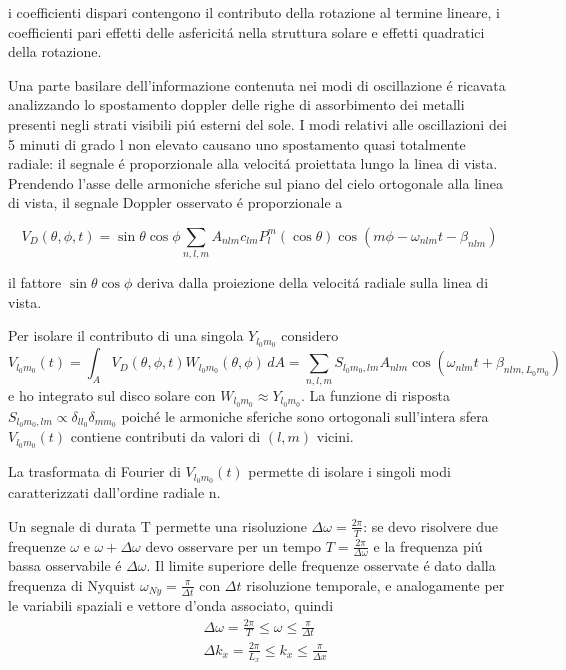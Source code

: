 \documentclass[../main.tex]{subfiles}
\begin{document}
i coefficienti dispari contengono il contributo della rotazione al termine lineare, i coefficienti pari effetti delle asfericit\'a nella struttura solare e effetti quadratici della rotazione.

Una parte basilare dell'informazione contenuta nei modi di oscillazione \'e ricavata analizzando  lo spostamento doppler delle righe di assorbimento dei metalli presenti negli strati visibili pi\'u esterni del sole.
I modi relativi alle oscillazioni dei 5 minuti di grado l non elevato causano uno spostamento quasi totalmente radiale: il segnale \'e proporzionale alla velocit\'a proiettata lungo la linea di vista. Prendendo l'asse delle armoniche sferiche sul piano del cielo ortogonale alla linea di vista, il segnale Doppler osservato \'e proporzionale a

\begin{equation}
    V_D(\theta,\phi,t)=\sin{\theta}\cos{\phi}\sum_{n,l,m}A_{nlm}c_{lm}P_l^m(\cos{\theta})\cos{(m\phi-\omega_{nlm}t-\beta_{nlm})}
\end{equation}

il fattore $\sin{\theta}\cos{\phi}$ deriva dalla proiezione della velocit\'a radiale sulla linea di vista.

Per isolare il contributo di una singola $Y_{l_0m_0}$ considero
\begin{equation}
V_{l_0m_0}(t)=\int_AV_D(\theta,\phi,t)W_{l_0m_0}(\theta,\phi)\,dA=\sum_{n,l,m}S_{l_0m_0,lm}A_{nlm}\cos{(\omega_{nlm}t+\beta_{nlm,L_0m_0})}
\end{equation}
e ho integrato sul disco solare con $W_{l_0m_0}\approx Y_{l_0m_0}$. La funzione di risposta $S_{l_0m_0,lm}\propto\delta_{ll_0}\delta_{mm_0}$ poich\'e le armoniche sferiche sono ortogonali sull'intera sfera $V_{l_0m_0}(t)$ contiene contributi da valori di $(l,m)$ vicini.

La trasformata di Fourier di $V_{l_0m_0}(t)$ permette di isolare i singoli modi caratterizzati dall'ordine radiale n.

Un segnale di durata T permette una risoluzione $\Delta\omega=\frac{2\pi}{T}$: se devo risolvere due frequenze $\omega$ e $\omega+\Delta\omega$ devo osservare per un tempo $T=\frac{2\pi}{\Delta\omega}$ e la frequenza pi\'u bassa osservabile \'e $\Delta\omega$. Il limite superiore delle frequenze osservate \'e dato dalla frequenza di Nyquist $\omega_{Ny}=\frac{\pi}{\Delta t}$ con $\Delta t$ risoluzione temporale, e analogamente per le variabili spaziali e vettore d'onda associato, quindi
\begin{align}
&\Delta\omega=\frac{2\pi}{T}\leq\omega\leq\frac{\pi}{\Delta t}\\
&\Delta k_x=\frac{2\pi}{L_x}\leq k_x\leq\frac{\pi}{\Delta x}
\end{align}
\end{document}
